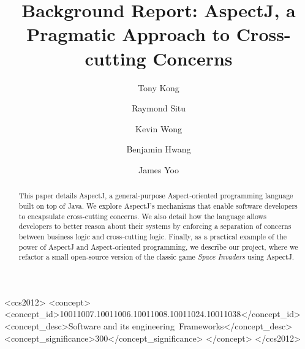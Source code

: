 \documentclass[sigconf]{acmart}
\begin{document}
\title{Background Report: AspectJ, a Pragmatic Approach to Cross-cutting Concerns}

\author{Tony Kong}

\author{Raymond Situ}

\author{Kevin Wong}

\author{Benjamin Hwang}

\author{James Yoo}

\begin{abstract}
This paper details AspectJ, a general-purpose Aspect-oriented programming language built on top of Java. We explore AspectJ's mechanisms that enable software developers to encapsulate cross-cutting concerns. We also detail how the language allows developers to better reason about their systems by enforcing a separation of concerns between business logic and cross-cutting logic. Finally, as a practical example of the power of AspectJ and Aspect-oriented programming, we describe our project, where we refactor a small open-source version of the classic game \textit{Space Invaders} using AspectJ.
\end{abstract}

\begin{CCSXML}
<ccs2012>
<concept>
<concept_id>10011007.10011006.10011008.10011024.10011038</concept_id>
<concept_desc>Software and its engineering~Frameworks</concept_desc>
<concept_significance>300</concept_significance>
</concept>
</ccs2012>
\end{CCSXML}

\maketitle
\end{document}
